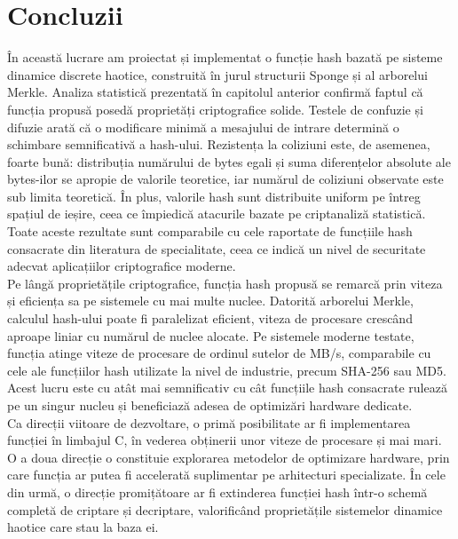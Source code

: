 \section{Concluzii}
În această lucrare am proiectat și implementat o funcție hash bazată pe sisteme dinamice discrete haotice, construită în jurul structurii Sponge și al arborelui Merkle.
Analiza statistică prezentată în capitolul anterior confirmă faptul că funcția propusă posedă proprietăți criptografice solide.
Testele de confuzie și difuzie arată că o modificare minimă a mesajului de intrare determină o schimbare semnificativă a hash-ului.
Rezistența la coliziuni este, de asemenea, foarte bună: distribuția numărului de bytes egali și suma diferențelor absolute ale bytes-ilor se apropie de valorile teoretice, iar numărul de coliziuni observate este sub limita teoretică.
În plus, valorile hash sunt distribuite uniform pe întreg spațiul de ieșire, ceea ce împiedică atacurile bazate pe criptanaliză statistică.
Toate aceste rezultate sunt comparabile cu cele raportate de funcțiile hash consacrate din literatura de specialitate, ceea ce indică un nivel de securitate adecvat aplicațiilor criptografice moderne. \\

Pe lângă proprietățile criptografice, funcția hash propusă se remarcă prin viteza și eficiența sa pe sistemele cu mai multe nuclee.
Datorită arborelui Merkle, calculul hash-ului poate fi paralelizat eficient, viteza de procesare crescând aproape liniar cu numărul de nuclee alocate.
Pe sistemele moderne testate, funcția atinge viteze de procesare de ordinul sutelor de MB/s, comparabile cu cele ale funcțiilor hash utilizate la nivel de industrie, precum SHA-256 sau MD5.
Acest lucru este cu atât mai semnificativ cu cât funcțiile hash consacrate rulează pe un singur nucleu și beneficiază adesea de optimizări hardware dedicate. \\

Ca direcții viitoare de dezvoltare, o primă posibilitate ar fi implementarea funcției în limbajul C, în vederea obținerii unor viteze de procesare și mai mari.
O a doua direcție o constituie explorarea metodelor de optimizare hardware, prin care funcția ar putea fi accelerată suplimentar pe arhitecturi specializate.
În cele din urmă, o direcție promițătoare ar fi extinderea funcției hash într-o schemă completă de criptare și decriptare, valorificând proprietățile sistemelor dinamice haotice care stau la baza ei.
